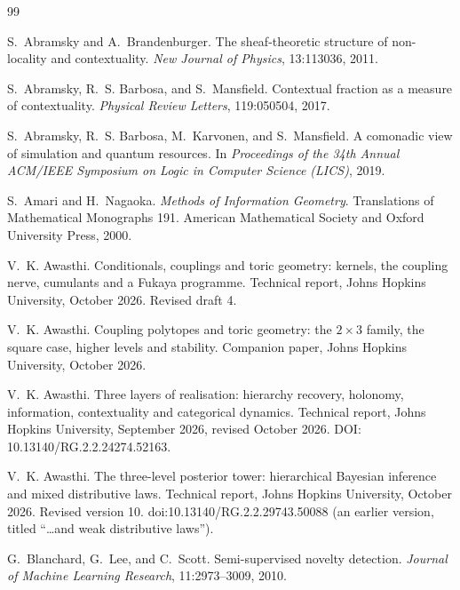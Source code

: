 \documentclass[11pt]{article}
\theoremstyle{definition}
\theoremstyle{remark}
\begin{document}
\begin{thebibliography}{99}

S.~Abramsky and A.~Brandenburger.
\newblock The sheaf-theoretic structure of non-locality and contextuality.
\newblock \emph{New Journal of Physics}, 13:113036, 2011.

S.~Abramsky, R.~S. Barbosa, and S.~Mansfield.
\newblock Contextual fraction as a measure of contextuality.
\newblock \emph{Physical Review Letters}, 119:050504, 2017.

S.~Abramsky, R.~S. Barbosa, M.~Karvonen, and S.~Mansfield.
\newblock A comonadic view of simulation and quantum resources.
\newblock In \emph{Proceedings of the 34th Annual ACM/IEEE Symposium on Logic in Computer Science
  (LICS)}, 2019.

S.~Amari and H.~Nagaoka.
\newblock \emph{Methods of Information Geometry}.
\newblock Translations of Mathematical Monographs 191. American Mathematical Society and Oxford
University Press, 2000.

V.~K. Awasthi.
\newblock Conditionals, couplings and toric geometry: kernels, the coupling nerve, cumulants and a {F}ukaya
programme.
\newblock Technical report, Johns Hopkins University, October 2026. Revised draft 4.

V.~K. Awasthi.
\newblock Coupling polytopes and toric geometry: the $2\times3$ family, the square case, higher levels and stability.
\newblock Companion paper, Johns Hopkins University, October 2026.

V.~K. Awasthi.
\newblock Three layers of realisation: hierarchy recovery, holonomy, information, contextuality and categorical dynamics.
\newblock Technical report, Johns Hopkins University, September 2026, revised October 2026.
\newblock DOI: 10.13140/RG.2.2.24274.52163.

V.~K. Awasthi.
\newblock The three-level posterior tower: hierarchical Bayesian inference and mixed distributive laws.
\newblock Technical report, Johns Hopkins University, October 2026. Revised version 10.
\newblock doi:10.13140/RG.2.2.29743.50088 (an earlier version, titled ``\ldots and weak distributive laws'').

G.~Blanchard, G.~Lee, and C.~Scott.
\newblock Semi-supervised novelty detection.
\newblock \emph{Journal of Machine Learning Research}, 11:2973--3009, 2010.


\end{thebibliography}
\end{document}
